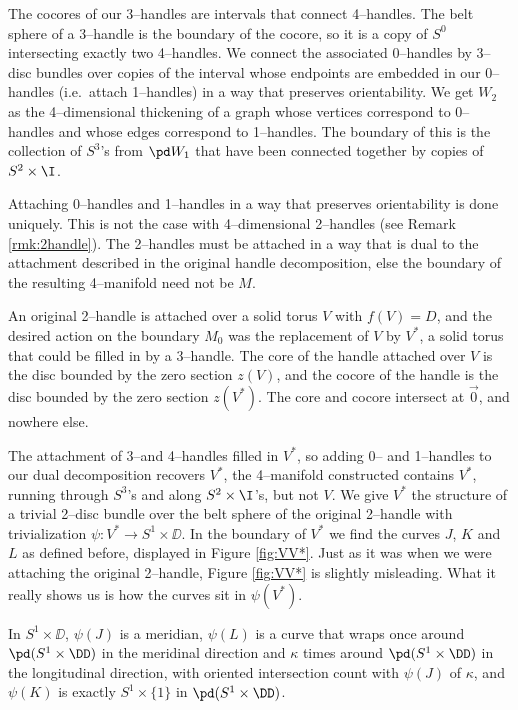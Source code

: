	The cocores of our 3--handles are intervals that connect 4--handles.
	The belt sphere of a 3--handle is the boundary of the cocore, so it is a copy of $S^0$ intersecting exactly two 4--handles.
	We connect the associated 0--handles by 3--disc bundles over copies of the interval whose endpoints are embedded in our 0--handles (i.e.\ attach 1--handles) in a way that preserves orientability.
	We get $W_2$ as the 4--dimensional thickening of a graph whose vertices correspond to 0--handles and whose edges correspond to 1--handles.
	The boundary of this is the collection of $S^3$'s from $\pd W_1$ that have been connected together by copies of $S^2\times\I$.
	
	Attaching 0--handles and 1--handles in a way that preserves orientability is done uniquely.
	This is not the case with 4--dimensional 2--handles (see Remark \ref{rmk:2handle}).
	The 2--handles must be attached in a way that is dual to the attachment described in the original handle decomposition, else the boundary of the resulting 4--manifold need not be $M$.
	
	An original 2--handle is attached over a solid torus $V$ with $f(V)=D$, and the desired action on the boundary $M_0$ was the replacement of $V$ by $V^*$, a solid torus that could be filled in by a 3--handle.
	The core of the handle attached over $V$ is the disc bounded by the zero section $z(V)$, and the cocore of the handle is the disc bounded by the zero section $z(V^*)$.
	The core and cocore intersect at $\vec{0}$, and nowhere else.
	
	The attachment of 3--and 4--handles filled in $V^*$, so adding 0-- and 1--handles to our dual decomposition recovers $V^*$, the 4--manifold constructed contains $V^*$, running through $S^3$'s and along $S^2\times\I$'s, but not $V$.
	We give $V^*$ the structure of a trivial 2--disc bundle over the belt sphere of the original 2--handle with trivialization $\psi:V^*\to S^1\times\DD$.
	In the boundary of $V^*$ we find the curves $J$, $K$ and $L$ as defined before, displayed in Figure \ref{fig:VV*}.
	Just as it was when we were attaching the original 2--handle, Figure \ref{fig:VV*} is slightly misleading.
	What it really shows us is how the curves sit in $\psi(V^*)$.
	
	In $S^1\times\DD$, $\psi(J)$ is a meridian, $\psi(L)$ is a curve that wraps once around $\pd(S^1\times\DD)$ in the meridinal direction and $\kappa$ times around $\pd(S^1\times\DD)$ in the longitudinal direction, with oriented intersection count with $\psi(J)$ of $\kappa$, and $\psi(K)$ is exactly $S^1\times\{1\}$ in $\pd(S^1\times\DD)$.
	
